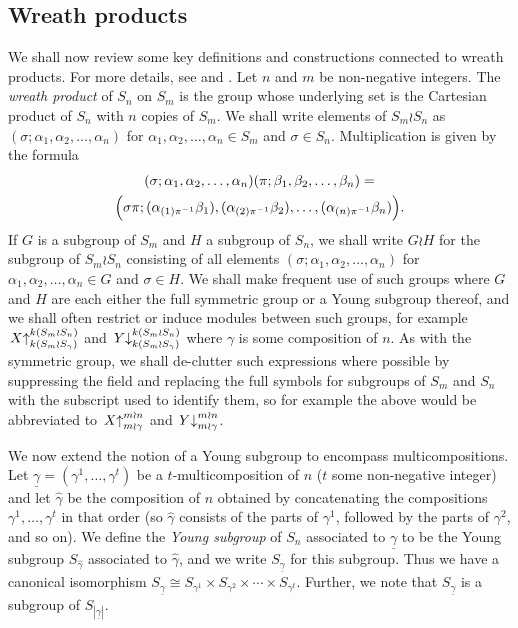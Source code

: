 \documentclass[10pt]{article}
\theoremstyle{definition}
\newcommand{\ul}[1]{\underline{#1}}
\begin{document}
\subsection{Wreath products}
We shall now review some key definitions and constructions connected to wreath products. For more details, see \cite{CHTAN} and
\cite[Chapter 4]{JAMKER}.
Let $n$ and $m$ be non-negative integers. The \textit{wreath product} of $S_n$ on $S_m$ is the group whose underlying set is the
Cartesian product of $S_n$ with $n$ copies of $S_m$. We shall write elements of $S_m{\wr}S_n$ as
$(\sigma;\alpha_1,\alpha_2,\ldots,\alpha_n)$ for $\alpha_1,\alpha_2,\ldots,\alpha_n \in S_m$ and $\sigma \in S_n$. Multiplication is given
by the formula
\begin{multline*}
	(\sigma;\alpha_1,\alpha_2,\ldots,\alpha_n)(\pi;\beta_1,\beta_2,\ldots,\beta_n) =\\
	\Bigl(\sigma\pi;(\alpha_{(1)\pi^{-1}}\beta_1),(\alpha_{(2)\pi^{-1}}\beta_2),\ldots,(\alpha_{(n)\pi^{-1}}\beta_n)\Bigr).
\end{multline*}
If $G$ is a subgroup of $S_m$ and $H$ a subgroup of $S_n$, we shall write $G{\wr}H$ for the subgroup of $S_m{\wr}S_n$
consisting of all elements $(\sigma;\alpha_1,\alpha_2,\ldots,\alpha_n)$ for $\alpha_1,\alpha_2,\ldots,\alpha_n \in G$ and $\sigma \in H$.
We shall make frequent use of such groups where $G$ and $H$ are each either the full symmetric group or a Young subgroup thereof, and we
shall often restrict or induce modules between such groups, for example
$\left.X\right\uparrow^{k(S_m{\wr}S_n)}_{k(S_m{\wr}S_\gamma)}$ and $\left.Y\right\downarrow^{k({S_m{\wr}S_n})}_{k({S_m{\wr}S_\gamma})}$
where $\gamma$ is some composition of $n$. As with the symmetric group, we shall de-clutter such expressions where possible by suppressing
the field and replacing the full symbols for subgroups of $S_m$ and $S_n$ with the subscript used to identify them,
so for example the above would be abbreviated to
$\left.X\right\uparrow^{m{\wr}n}_{m{\wr}\gamma}$ and $\left.Y\right\downarrow^{m{\wr}n}_{m{\wr}\gamma}$.

We now extend the notion of a Young subgroup to encompass multicompositions.
Let $\ul{\gamma} = (\gamma^1,\ldots,\gamma^t)$ be a $t$-multicomposition of $n$ ($t$ some non-negative integer) and let $\hat\gamma$ be
the composition of $n$ obtained by concatenating the compositions $\gamma^1,\ldots,\gamma^t$ in that order (so $\hat\gamma$ consists of
the parts of $\gamma^1$, followed by the parts of $\gamma^2$, and so on). We define the \textit{Young subgroup} of $S_n$ associated to
$\ul{\gamma}$ to be the Young subgroup $S_{\hat\gamma}$ associated to $\hat\gamma$, and we write $S_{\ul{\gamma}}$ for this subgroup. Thus we
have a canonical isomorphism $S_{\ul{\gamma}} \cong S_{\gamma^1} \times S_{\gamma^2} \times \cdots \times S_{\gamma^t}$.
Further, we note that $S_{\ul{\gamma}}$ is a subgroup of $S_{|\ul{\gamma}|}$.
\end{document}
